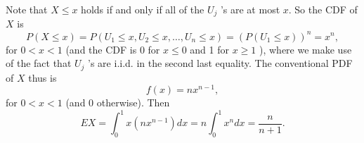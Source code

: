 

\setcounter{theorem}{13}
\begin{exercise}[BH.5.14] 
\begin{solution}
    Note that $X \leq x$ holds if and only if all of the $U_j$ 's are at most $x$. So the CDF of $X$ is
		$$
		P(X \leq x)=P\left(U_1 \leq x, U_2 \leq x, \ldots, U_n \leq x\right)=\left(P\left(U_1 \leq x\right)\right)^n=x^n,
		$$
		for $0<x<1$ (and the CDF is 0 for $x \leq 0$ and 1 for $x \geq 1$ ), where we make use of the fact that $U_j$ 's are i.i.d. in the second last equality. The conventional PDF of $X$ thus is
		$$
		f(x)=n x^{n-1},
		$$
		for $0<x<1$ (and 0 otherwise). Then
		$$
		E X=\int_0^1 x\left(n x^{n-1}\right) d x=n \int_0^1 x^n d x=\frac{n}{n+1} .
		$$ 
\end{solution}
\end{exercise}


